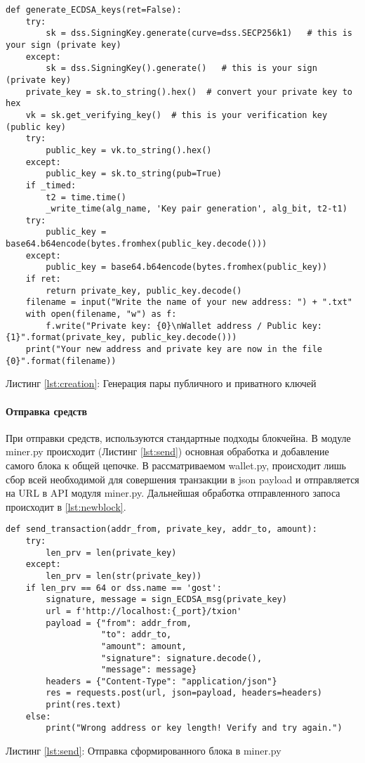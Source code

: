\begin{center}
\begin{lstlisting}
def generate_ECDSA_keys(ret=False):
    try:
        sk = dss.SigningKey.generate(curve=dss.SECP256k1)   # this is your sign (private key)
    except:
        sk = dss.SigningKey().generate()   # this is your sign (private key)
    private_key = sk.to_string().hex()  # convert your private key to hex
    vk = sk.get_verifying_key()  # this is your verification key (public key)
    try:
        public_key = vk.to_string().hex()
    except:
        public_key = sk.to_string(pub=True)
    if _timed:
        t2 = time.time()
        _write_time(alg_name, 'Key pair generation', alg_bit, t2-t1)
    try:
        public_key = base64.b64encode(bytes.fromhex(public_key.decode()))
    except:
        public_key = base64.b64encode(bytes.fromhex(public_key))
    if ret:
        return private_key, public_key.decode()
    filename = input("Write the name of your new address: ") + ".txt"
    with open(filename, "w") as f:
        f.write("Private key: {0}\nWallet address / Public key: {1}".format(private_key, public_key.decode()))
    print("Your new address and private key are now in the file {0}".format(filename))
\end{lstlisting}\label{lst:creation}
    Листинг \ref{lst:creation}: Генерация пары публичного и приватного ключей
\end{center}



\paragraph{Отправка средств}
При отправки средств, используются стандартные подходы блокчейна. В модуле
{\small miner.py} происходит (Листинг \ref{lst:send}) основная обработка и
добавление самого блока к общей цепочке. В рассматриваемом {\small wallet.py},
происходит лишь сбор всей необходимой для совершения транзакции в json payload
и отправляется на URL в API модуля {\small miner.py}. Дальнейшая обработка
отправленного запоса происходит в \ref{lst:newblock}.

\begin{center}
\begin{lstlisting}
def send_transaction(addr_from, private_key, addr_to, amount):
    try:
        len_prv = len(private_key)
    except:
        len_prv = len(str(private_key))
    if len_prv == 64 or dss.name == 'gost':
        signature, message = sign_ECDSA_msg(private_key)
        url = f'http://localhost:{_port}/txion'
        payload = {"from": addr_from,
                   "to": addr_to,
                   "amount": amount,
                   "signature": signature.decode(),
                   "message": message}
        headers = {"Content-Type": "application/json"}
        res = requests.post(url, json=payload, headers=headers)
        print(res.text)
    else:
        print("Wrong address or key length! Verify and try again.")
\end{lstlisting}\label{lst:send}
    Листинг \ref{lst:send}: Отправка сформированного блока в {\small miner.py}
\end{center}


